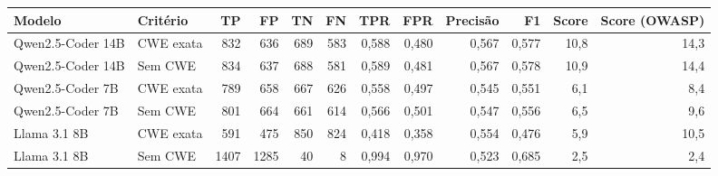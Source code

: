 \begin{tabular}{llrrrrrrrrrr}
\hline
Modelo & Critério & TP & FP & TN & FN & TPR & FPR & Precisão & F1 & Score & Score (OWASP) \\
\hline
Qwen2.5-Coder 14B & CWE exata & 832 & 636 & 689 & 583 & 0,588 & 0,480 & 0,567 & 0,577 & 10,8 & 14,3 \\
Qwen2.5-Coder 14B & Sem CWE & 834 & 637 & 688 & 581 & 0,589 & 0,481 & 0,567 & 0,578 & 10,9 & 14,4 \\
Qwen2.5-Coder 7B & CWE exata & 789 & 658 & 667 & 626 & 0,558 & 0,497 & 0,545 & 0,551 & 6,1 & 8,4 \\
Qwen2.5-Coder 7B & Sem CWE & 801 & 664 & 661 & 614 & 0,566 & 0,501 & 0,547 & 0,556 & 6,5 & 9,6 \\
Llama 3.1 8B & CWE exata & 591 & 475 & 850 & 824 & 0,418 & 0,358 & 0,554 & 0,476 & 5,9 & 10,5 \\
Llama 3.1 8B & Sem CWE & 1407 & 1285 & 40 & 8 & 0,994 & 0,970 & 0,523 & 0,685 & 2,5 & 2,4 \\
\hline
\end{tabular}
